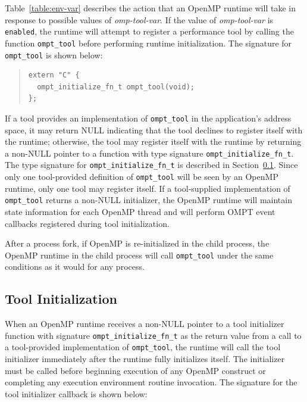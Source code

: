 \documentclass{article}
\begin{document}
\sloppy
Table~\ref{table:env-var} describes the action that an OpenMP runtime will take in response to possible values of {\em omp-tool-var}.
If the value of {\em omp-tool-var}  is  \lstinline|enabled|, the runtime will attempt to register  a performance tool by calling the function \lstinline|ompt_tool| before performing  runtime initialization. The signature for  \lstinline|ompt_tool|  is shown below:
\begin{quote}
\begin{lstlisting}
extern "C" {
  ompt_initialize_fn_t ompt_tool(void);
};
\end{lstlisting}
\end{quote}
 If a tool provides an implementation of \lstinline|ompt_tool| in the application's address space, it may return NULL indicating that the tool declines to register itself with the runtime; otherwise, the tool  may register itself with the runtime by returning a non-NULL pointer to a function with type signature \lstinline|ompt_initialize_fn_t|. The type signature for \lstinline|ompt_initialize_fn_t| is described in Section~\ref{sec:init}. 
Since only one tool-provided definition of \lstinline|ompt_tool| will be seen by an OpenMP runtime, only one tool may register itself. 
If a tool-supplied implementation of \lstinline|ompt_tool| returns a non-NULL initializer, the OpenMP runtime will maintain state information for each OpenMP thread and will perform OMPT event callbacks registered during tool initialization. 

After a process fork, if OpenMP is re-initialized in the child process,
the OpenMP runtime in the child process will call  \lstinline|ompt_tool| under the same conditions as it would for any process. 

\subsection{Tool Initialization}
\label{sec:init}

When an OpenMP runtime receives a non-NULL pointer to a tool initializer function with signature \lstinline|ompt_initialize_fn_t| as the return value from a call to a tool-provided implementation of \lstinline|ompt_tool|, the runtime will call the tool initializer immediately after the runtime fully initializes itself. The initializer must be called before beginning execution of any OpenMP construct or completing any execution environment  routine invocation.  The signature for the tool initializer callback is shown below:
\end{document}
